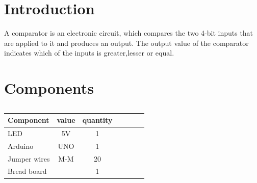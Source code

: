 \documentclass[10pt, a4paper]{article}
\title{\mytitle}
\author{\myauthor\hspace{1em}\\\contact\\IITH\hspace{0.5em}-\hspace{0.5em}\mymodule}
\date{}
\begin{document}
 \maketitle
 \tableofcontents
 \begin{abstract}
Design a sequential circuit that take(A3,A2,A1,A0) and (B3,B2,B1,B0) compares both A and B.The o/p should  be either one of the (A<B),(A>B),(A=B) and it will be displayed by LED's.

 \end{abstract}
    \section{Introduction}
    A comparator is an electronic circuit, which compares the two 4-bit inputs that are applied to it and produces an output. The output value of the comparator indicates which of the inputs is greater,lesser or equal.
 \section{Components}
 
\begin{table}[htbp]
 \begin{center}
    \begin{tabular}{|l|c|c|c|c|c|c} \hline \textbf{Component}
  & \textbf{value} & \textbf{quantity} \\
 \hline
LED & 5V & 1 \\ \hline
Arduino & UNO & 1 \\ \hline
Jumper wires & M-M & 20\\ \hline

Bread board &  & 1 \\ \hline
\end{tabular}   
\end{center}
\caption{\label{table:table} }
\end{table}
\end{document}
